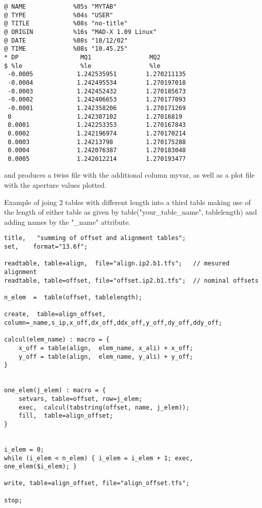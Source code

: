 \begin{verbatim}
@ NAME             %05s "MYTAB"
@ TYPE             %04s "USER"
@ TITLE            %08s "no-title"
@ ORIGIN           %16s "MAD-X 1.09 Linux"
@ DATE             %08s "10/12/02"
@ TIME             %08s "10.45.25"
* DP                 MQ1                MQ2                
$ %le                %le                %le                
 -0.0005            1.242535951        1.270211135       
 -0.0004            1.242495534        1.270197018       
 -0.0003            1.242452432        1.270185673       
 -0.0002            1.242406653        1.270177093       
 -0.0001            1.242358206        1.270171269       
 0                  1.242307102        1.27016819        
 0.0001             1.242253353        1.270167843       
 0.0002             1.242196974        1.270170214       
 0.0003             1.24213798         1.270175288       
 0.0004             1.242076387        1.270183048       
 0.0005             1.242012214        1.270193477       
\end{verbatim}
and produces a twiss file with the additional column myvar, as well as a plot
file with the aperture values plotted.


\href{screate}{}

Example of joing 2 tables with different length into a third table
making use of the length of either table as given by
table("your\_table\_name", tablelength) and adding names by the "\_name"
attribute.

\begin{verbatim}
title,   "summing of offset and alignment tables";
set,    format="13.6f";

readtable, table=align,  file="align.ip2.b1.tfs";   // mesured alignment
readtable, table=offset, file="offset.ip2.b1.tfs";  // nominal offsets

n_elem  =  table(offset, tablelength);

create,  table=align_offset, column=_name,s_ip,x_off,dx_off,ddx_off,y_off,dy_off,ddy_off;

calcul(elem_name) : macro = {
    x_off = table(align,  elem_name, x_ali) + x_off;
    y_off = table(align,  elem_name, y_ali) + y_off;
}


one_elem(j_elem) : macro = {
    setvars, table=offset, row=j_elem;
    exec,  calcul(tabstring(offset, name, j_elem));
    fill,  table=align_offset;
}


i_elem = 0;
while (i_elem < n_elem) { i_elem = i_elem + 1; exec,  one_elem($i_elem); }

write, table=align_offset, file="align_offset.tfs";

stop;
\end{verbatim}


